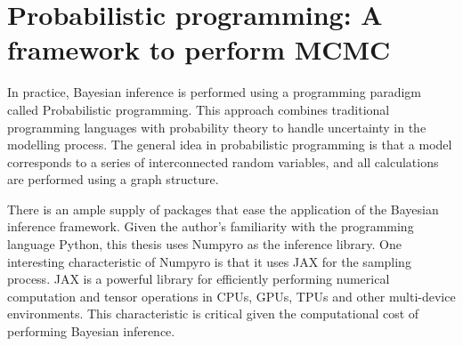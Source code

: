 \section{Probabilistic programming: A framework to perform MCMC }

In practice, Bayesian inference is performed using a programming paradigm called Probabilistic programming. This approach combines traditional programming languages with probability theory to handle uncertainty in the modelling process. The general idea in probabilistic programming is that a model corresponds to a series of interconnected random variables, and all calculations are performed using a graph structure. 

There is an ample supply of packages that ease the application of the Bayesian inference framework. Given the author's familiarity with the programming language Python, this thesis uses Numpyro \citep{Phan2019} as the inference library. One interesting characteristic of Numpyro is that it uses JAX for the sampling process. JAX is a powerful library for efficiently performing numerical computation and tensor operations in CPUs, GPUs, TPUs and other multi-device environments. This characteristic is critical given the computational cost of performing Bayesian inference. 